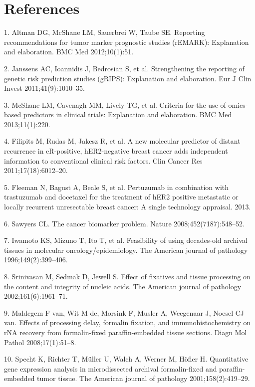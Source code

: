 \documentclass[11pt]{article}
\begin{document}
\section{References}\label{references}

\setlength{\parindent}{0pt}

1. Altman DG, McShane LM, Sauerbrei W, Taube SE. Reporting
recommendations for tumor marker prognostic studies (rEMARK):
Explanation and elaboration. BMC Med 2012;10(1):51.

2. Janssens AC, Ioannidis J, Bedrosian S, et al. Strengthening the
reporting of genetic risk prediction studies (gRIPS): Explanation and
elaboration. Eur J Clin Invest 2011;41(9):1010--35.

3. McShane LM, Cavenagh MM, Lively TG, et al. Criteria for the use of
omics-based predictors in clinical trials: Explanation and elaboration.
BMC Med 2013;11(1):220.

4. Filipits M, Rudas M, Jakesz R, et al. A new molecular predictor of
distant recurrence in eR-positive, hER2-negative breast cancer adds
independent information to conventional clinical risk factors. Clin
Cancer Res 2011;17(18):6012--20.

5. Fleeman N, Bagust A, Beale S, et al. Pertuzumab in combination with
trastuzumab and docetaxel for the treatment of hER2 positive metastatic
or locally recurrent unresectable breast cancer: A single technology
appraisal. 2013.

6. Sawyers CL. The cancer biomarker problem. Nature
2008;452(7187):548--52.

7. Iwamoto KS, Mizuno T, Ito T, et al. Feasibility of using decades-old
archival tissues in molecular oncology/epidemiology. The American
journal of pathology 1996;149(2):399--406.

8. Srinivasan M, Sedmak D, Jewell S. Effect of fixatives and tissue
processing on the content and integrity of nucleic acids. The American
journal of pathology 2002;161(6):1961--71.

9. Maldegem F van, Wit M de, Morsink F, Musler A, Weegenaar J, Noesel CJ
van. Effects of processing delay, formalin fixation, and
immunohistochemistry on rNA recovery from formalin-fixed
paraffin-embedded tissue sections. Diagn Mol Pathol 2008;17(1):51--8.

10. Specht K, Richter T, M{ü}ller U, Walch A, Werner M, H{ö}fler H.
Quantitative gene expression analysis in microdissected archival
formalin-fixed and paraffin-embedded tumor tissue. The American journal
of pathology 2001;158(2):419--29.
\end{document}
